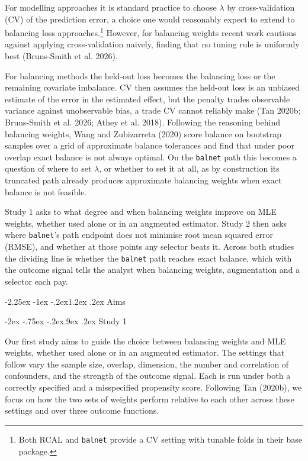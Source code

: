 \documentclass[
  12pt,
  a4paper,
]{article}
\makeatletter
\renewcommand\section{\@startsection{section}{1}{\z@}%
  {-2.25ex \@plus -1ex \@minus -.2ex}{1.2ex \@plus .2ex}%
  {\normalfont\Large\bfseries}}
\renewcommand\subsection{\@startsection{subsection}{2}{\z@}%
  {-2ex \@plus -.75ex \@minus -.2ex}{.9ex \@plus .2ex}%
  {\normalfont\large\bfseries}}
\makeatother
\begin{document}
For modelling approaches it is standard practice to choose \(\lambda\)
by cross-validation (CV) of the prediction error, a choice one would
reasonably expect to extend to balancing loss approaches.\footnote{Both
  RCAL and \texttt{balnet} provide a CV setting with tunable folds in
  their base package.} However, for balancing weights recent work
cautions against applying cross-validation naively, finding that no
tuning rule is uniformly best (Bruns-Smith et al. 2026).

For balancing methods the held-out loss becomes the balancing loss or
the remaining covariate imbalance. CV then assumes the held-out loss is
an unbiased estimate of the error in the estimated effect, but the
penalty trades observable variance against unobservable bias, a trade CV
cannot reliably make (Tan 2020b; Bruns-Smith et al. 2026; Athey et al.
2018). Following the reasoning behind balancing weights, Wang and
Zubizarreta (2020) score balance on bootstrap samples over a grid of
approximate balance tolerances and find that under poor overlap exact
balance is not always optimal. On the \texttt{balnet} path this becomes
a question of where to set \(\lambda\), or whether to set it at all, as
by construction its truncated path already produces approximate
balancing weights when exact balance is not feasible.

Study 1 asks to what degree and when balancing weights improve on MLE
weights, whether used alone or in an augmented estimator. Study 2 then
asks where \texttt{balnet}'s path endpoint does not minimise root mean
squared error (RMSE), and whether at those points any selector beats it.
Across both studies the dividing line is whether the \texttt{balnet}
path reaches exact balance, which with the outcome signal tells the
analyst when balancing weights, augmentation and a selector each pay.

\section{Aims}\label{aims}

\subsection{Study 1}\label{study-1}

Our first study aims to guide the choice between balancing weights and
MLE weights, whether used alone or in an augmented estimator. The
settings that follow vary the sample size, overlap, dimension, the
number and correlation of confounders, and the strength of the outcome
signal. Each is run under both a correctly specified and a misspecified
propensity score. Following Tan (2020b), we focus on how the two sets of
weights perform relative to each other across these settings and over
three outcome functions.
\end{document}
